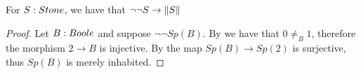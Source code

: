 \begin{corollary}\label{LemSurjectionsFormalToCompleteness}
 For $S:\Stone$, we have that $\neg \neg S \to  \lVert S \rVert$
\end{corollary}
\begin{proof}
  Let $B:\Boole$ and suppose $\neg \neg Sp(B)$. By  we have that $0\not=_B1$, therefore the morphism $2\to B$ is injective. By  the map $Sp(B) \to Sp(2)$ is surjective, thus $Sp(B)$ is merely inhabited. 
\end{proof} 




